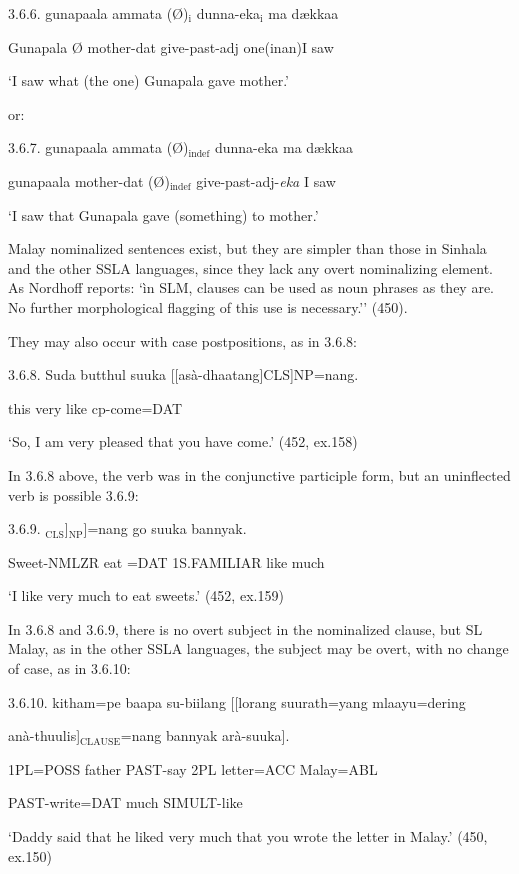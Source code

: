 \documentclass[letterpaper]{article}
\newcommand\textsubscript[1]{\ensuremath{{}_{\text{#1}}}}
\begin{document}
 3.6.6.
\ea
\gll  gunapaala ammat{\dag}a ({\O})\textsubscript{i} dunna-eka\textsubscript{i}  ma{\textcopyright} d{\ae}kkaa

  Gunapala {\O}  mother-dat give-past-adj one(inan)I saw

  `I saw what (the one) Gunapala gave mother.'

or:

 3.6.7. 
\ea
\gll gunapaala ammat{\dag}a ({\O})\textsubscript{indef} dunna-eka  ma{\textcopyright} d{\ae}kkaa

  gunapaala mother-dat ({\O})\textsubscript{indef} give-past-adj-\textit{eka}  I saw

  `I saw that Gunapala gave (something) to mother.'

 Malay nominalized sentences exist, but they are simpler than those in Sinhala and the other SSLA languages, since they lack any overt nominalizing element. As Nordhoff reports: `ìn SLM, clauses can be used as noun phrases as they are. No further morphological flagging of this use is necessary.'' (450). 

 They may also occur with case postpositions, as in 3.6.8:

 3.6.8. 
\ea
\gll Suda butthul suuka [[asà-dhaatang]CLS]NP=nang.

  this very  like cp-come=DAT

  `So, I am very pleased that you have come.'  (452, ex.158)

 In 3.6.8 above, the verb was in the conjunctive participle form, but an uninflected verb is possible 3.6.9:

 3.6.9. 
\ea
{}\textsubscript{CLS}]\textsubscript{NP}]=nang go suuka bannyak.

  Sweet-NMLZR eat =DAT  1S.FAMILIAR like much

  `I like very much to eat sweets.'  (452, ex.159)

 In 3.6.8 and 3.6.9, there is no overt subject in the nominalized clause, but SL Malay, as in the other SSLA languages, the subject may be overt, with no change of case, as in  3.6.10:

 3.6.10.
\ea
\gll  kitham=pe baapa su-biilang [[lorang suurath=yang  mlaayu=dering 

   anà-thuulis]\textsubscript{CLAUSE}=nang bannyak arà-suuka].

  1PL=POSS father PAST-say 2PL  letter=ACC Malay=ABL 

   PAST-write=DAT much SIMULT-like

    `Daddy said that he liked very much that you wrote the letter in Malay.'  (450, ex.150)
\end{document}
